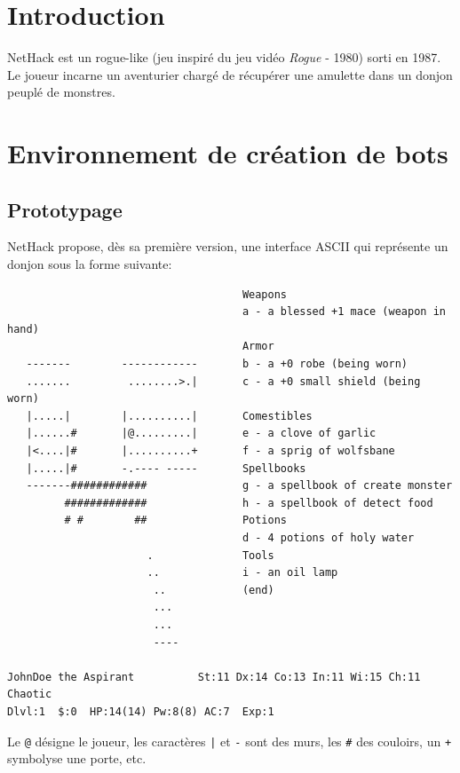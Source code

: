 \documentclass[a4paper]{article}
\begin{document}
\tableofcontents
\pagebreak

\section{Introduction}

NetHack est un rogue-like (jeu inspiré du jeu vidéo \emph{Rogue} - 1980)
sorti en 1987. Le joueur incarne un aventurier chargé de récupérer une
amulette dans un donjon peuplé de monstres.


\section{Environnement de création de bots}

\subsection{Prototypage}

NetHack propose, dès sa première version, une interface ASCII qui représente un donjon sous la forme suivante:

\begin{verbatim}
                                     Weapons
                                     a - a blessed +1 mace (weapon in hand)
                                     Armor
   -------        ------------       b - a +0 robe (being worn)
   .......         ........>.|       c - a +0 small shield (being worn)
   |.....|        |..........|       Comestibles
   |......#       |@.........|       e - a clove of garlic
   |<....|#       |..........+       f - a sprig of wolfsbane
   |.....|#       -.---- -----       Spellbooks
   -------############               g - a spellbook of create monster
         #############               h - a spellbook of detect food
         # #        ##               Potions
                                     d - 4 potions of holy water
                      .              Tools
                      ..             i - an oil lamp
                       ..            (end) 
                       ...
                       ...
                       ----

JohnDoe the Aspirant          St:11 Dx:14 Co:13 In:11 Wi:15 Ch:11  Chaotic
Dlvl:1  $:0  HP:14(14) Pw:8(8) AC:7  Exp:1
\end{verbatim}

Le \verb!@! désigne le joueur, les caractères \verb!|! et \verb!-! sont des murs, les \verb!#! des couloirs, un \verb!+! symbolyse une porte, etc.
\end{document}
